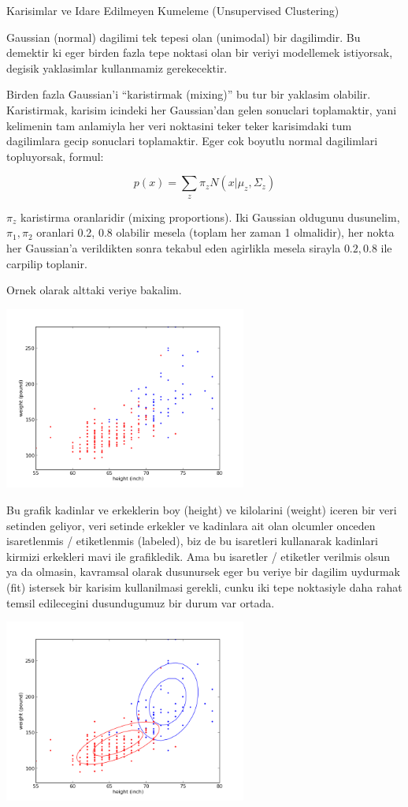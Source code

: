 \documentclass[12pt,fleqn]{article}\usepackage{../common}
\begin{document}
Karisimlar ve Idare Edilmeyen Kumeleme (Unsupervised Clustering)

Gaussian (normal) dagilimi tek tepesi olan (unimodal) bir dagilimdir. Bu
demektir ki eger birden fazla tepe noktasi olan bir veriyi modellemek
istiyorsak, degisik yaklasimlar kullanmamiz gerekecektir. 

Birden fazla Gaussian'i ``karistirmak (mixing)'' bu tur bir yaklasim
olabilir. Karistirmak, karisim icindeki her Gaussian'dan gelen sonuclari
toplamaktir, yani kelimenin tam anlamiyla her veri noktasini teker teker
karisimdaki tum dagilimlara gecip sonuclari toplamaktir. Eger cok boyutlu
normal dagilimlari topluyorsak, formul:

\[ p(x) = \sum_z \pi_z N(x | \mu_z,\Sigma_z) \]

$\pi_z$ karistirma oranlaridir (mixing proportions). Iki Gaussian oldugunu
dusunelim, $\pi_1,\pi_2$ oranlari 0.2, 0.8 olabilir mesela (toplam her
zaman 1 olmalidir), her nokta her Gaussian'a verildikten sonra tekabul eden
agirlikla mesela sirayla $0.2,0.8$ ile carpilip toplanir. 

Ornek olarak alttaki veriye bakalim.

\includegraphics[height=6cm]{plotbio.png}

Bu grafik kadinlar ve erkeklerin boy (height) ve kilolarini (weight) iceren
bir veri setinden geliyor, veri setinde erkekler ve kadinlara ait olan
olcumler onceden isaretlenmis / etiketlenmis (labeled), biz de bu
isaretleri kullanarak kadinlari kirmizi erkekleri mavi ile grafikledik. Ama
bu isaretler / etiketler verilmis olsun ya da olmasin, kavramsal olarak
dusunursek eger bu veriye bir dagilim uydurmak (fit) istersek bir karisim
kullanilmasi gerekli, cunku iki tepe noktasiyle daha rahat temsil
edilecegini dusundugumuz bir durum var ortada.

\includegraphics[height=6cm]{plotbio_cluster.png}
\end{document}
